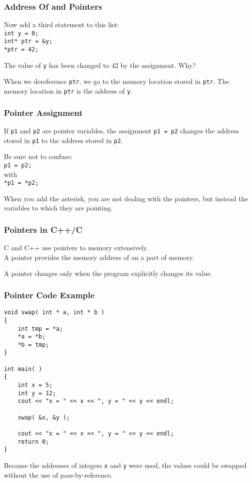 \begin{frame}
\frametitle{Address Of and Pointers}

Now add a third statement to this list:\\
\texttt{int y = 0;\\
int* ptr = \&y;\\
*ptr = 42;}

The value of \texttt{y} has been changed to 42 by the assignment. Why?

When we dereference \texttt{ptr}, we go to the memory location stored in \texttt{ptr}. The memory location in \texttt{ptr} is the address of \texttt{y}.

\end{frame}

\begin{frame}
\frametitle{Pointer Assignment}
If \texttt{p1} and \texttt{p2} are pointer variables, the assignment \texttt{p1 = p2} changes the address stored in \texttt{p1} to the address stored in \texttt{p2}.

Be sure not to confuse:\\
\texttt{p1 = p2;}\\
with \\
\texttt{*p1 = *p2;}

When you add the asterisk, you are not dealing with the pointers, but instead the variables to which they are pointing.

\end{frame}




\begin{frame}
\frametitle{Pointers in C++/C}



C and C++ use pointers to memory extensively.\\
\quad A pointer provides the memory address of an a part of memory.

A pointer changes only when the program explicitly changes its value.

\end{frame}

\begin{frame}[fragile]
\frametitle{Pointer Code Example}

{\scriptsize
\begin{verbatim}
void swap( int * a, int * b )
{
    int tmp = *a;
    *a = *b;
    *b = tmp;
}

int main( )
{
    int x = 5;
    int y = 12;
    cout << "x = " << x << ", y = " << y << endl;
	
    swap( &x, &y );

    cout << "x = " << x << ", y = " << y << endl;
    return 0;
}
\end{verbatim}
}

Because the addresses of integers \texttt{x} and \texttt{y} were used, the values could be swapped without the use of pass-by-reference.

\end{frame}



